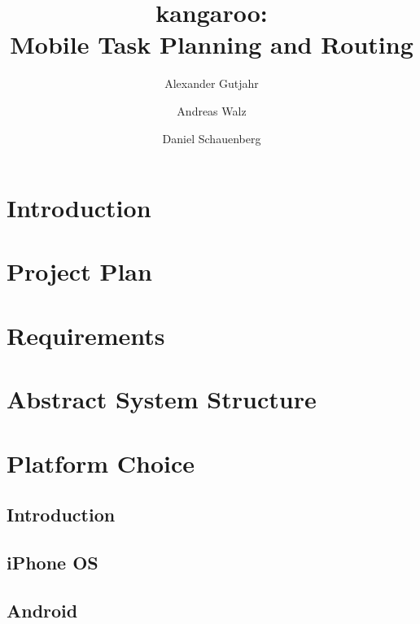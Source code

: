 \documentclass[11pt,a4paper]{scrreprt}
\begin{document}
\title{kangaroo: \\ Mobile Task Planning and Routing}
\author{Alexander Gutjahr \and Andreas Walz \and
        Daniel Schauenberg}

\maketitle

\tableofcontents

\chapter{Introduction} %
\label{chp:introduction}


\chapter{Project Plan} %
\label{chp:project_plan}


\chapter{Requirements} %
\label{chp:requirements}


\chapter{Abstract System Structure} %
\label{chp:structure}


\chapter{Platform Choice} %
\label{chp:platform_choice}

\section{Introduction} %
\label{sec:platform_introduction}


\section{iPhone OS} %
\label{sec:iphone}


\section{Android} %
\label{sec:android_plattform_choice}

\end{document}
